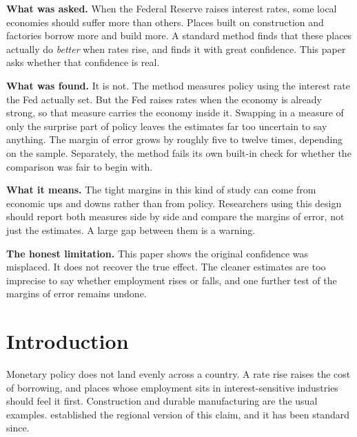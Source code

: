 \begin{summarybox}

\textbf{What was asked.} When the Federal Reserve raises interest rates, some
local economies should suffer more than others. Places built on construction
and factories borrow more and build more. A standard method finds that these
places actually do \emph{better} when rates rise, and finds it with great
confidence. This paper asks whether that confidence is real.

\textbf{What was found.} It is not. The method measures policy using the
interest rate the Fed actually set. But the Fed raises rates when the economy is
already strong, so that measure carries the economy inside it. Swapping in a
measure of only the surprise part of policy leaves the estimates far too
uncertain to say anything. The margin of error grows by roughly five to twelve
times, depending on the sample.
Separately, the method fails its own built-in check for whether the comparison
was fair to begin with.

\textbf{What it means.} The tight margins in this kind of study can come from
economic ups and downs rather than from policy. Researchers using this design
should report both measures side by side and compare the margins of error, not
just the estimates. A large gap between them is a warning.

\textbf{The honest limitation.} This paper shows the original confidence was
misplaced. It does not recover the true effect. The cleaner estimates are too
imprecise to say whether employment rises or falls, and one further test of the
margins of error remains undone.

\end{summarybox}


\section{Introduction}

Monetary policy does not land evenly across a country. A rate rise raises the
cost of borrowing, and places whose employment sits in interest-sensitive
industries should feel it first. Construction and durable manufacturing are the
usual examples. \citet{carlino1998} established the regional version of this
claim, and it has been standard since.

